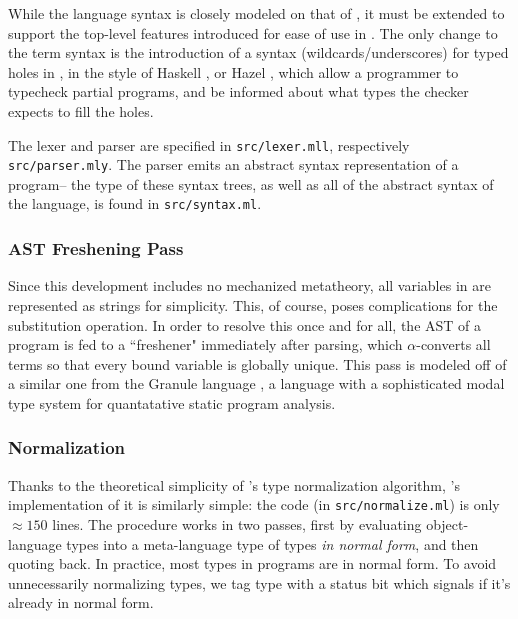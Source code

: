 While the language syntax is closely modeled on that of \bilambdaamor, it must be extended to support the top-level features introduced for ease of use in \lambdaamorimpl. The only change to the term syntax is the introduction of a syntax (wildcards/underscores) for typed holes in \lambdaamorimpl, in the style of Haskell \citehere, or Hazel \citehere, which allow a programmer to typecheck partial programs, and be informed about what types the checker expects to fill the holes.

The lexer and parser are specified in \texttt{src/lexer.mll}, respectively \texttt{src/parser.mly}. The parser emits an abstract syntax representation of a program-- the type of these syntax trees, as well as all of the abstract syntax of the language, is found in \texttt{src/syntax.ml}.


\subsubsection{AST Freshening Pass}
Since this development includes no mechanized metatheory, all variables in \lambdaamorimpl are represented as strings for simplicity. This, of course, poses complications for the substitution operation. In order to resolve this once and for all, the AST of a program is fed to a ``freshener" immediately after parsing, which $\alpha$-converts all terms so that every bound variable is globally unique. This pass is modeled off of a similar one from the Granule language \citehere, a language with a sophisticated modal type system for quantatative static program analysis.

\subsubsection{Normalization}
Thanks to the theoretical simplicity of \lambdaamor's type normalization algorithm, \lambdaamorimpl's implementation of it is similarly simple: the code (in \texttt{src/normalize.ml}) is only $\approx 150$ lines. The procedure works in two passes, first by evaluating object-language types into a meta-language type of types \textit{in normal form}, and then quoting back. In practice, most types in \lambdaamor programs are in normal form. To avoid unnecessarily normalizing types, we tag type with a status bit which signals if it's already in normal form.

